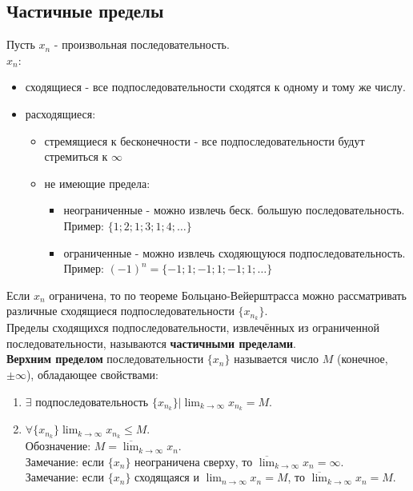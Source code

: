 \documentclass[12pt]{article}
\begin{document}
    \subsection{Частичные пределы}
    \noindent Пусть $x_n$ - произвольная последовательность.\\
    $x_n$:
    \begin{itemize}
        \item сходящиеся - все подпоследовательности сходятся к одному и тому же числу.
        \item расходящиеся:
              \begin{itemize}
                \item стремящиеся к бесконечности - все подпоследовательности будут стремиться к $\infty$
                \item не имеющие предела:
                      \begin{itemize}
                        \item неограниченные - можно извлечь беск. большую последовательность.\\Пример: $\{1; 2; 1; 3; 1; 4; \dots\}$
                        \item ограниченные - можно извлечь сходяющуюся подпоследовательность.\\Пример: $(-1)^n = \{-1; 1; -1; 1; -1; 1; \dots\}$
                      \end{itemize}
              \end{itemize}
    \end{itemize}
    Если $x_n$ ограничена, то по теореме Больцано-Вейерштрасса можно рассматривать различные сходящиеся подпоследовательности $\{x_{n_{k}}\}$.\\
    Пределы сходящихся подпоследовательности, извлечённых из ограниченной последовательности, называются \textbf{частичными пределами}.\\
    \textbf{Верхним пределом} последовательности $\{x_n\}$ называется число $M$ (конечное, $\pm \infty$), обладающее свойствами:
    \begin{enumerate}
        \item $\exists$ подпоследовательность $\{x_{n_{k}}\} \Big| \lim_{k\to\infty}x_{n_{k}} = M$.
        \item $\forall \{x_{n_{k}}\} \lim_{k\to\infty} x_{n_{k}} \le M$.\\
        Обозначение: $M = \overline{\lim}_{k\to\infty}x_n$.\\
        Замечание: если $\{x_n\}$ неограничена сверху, то $\overline{\lim}_{k\to\infty}x_n = \infty$.\\
        Замечание: если $\{x_n\}$ сходящаяся и $\lim_{n\to\infty} x_n = M$, то $\overline{\lim}_{k\to\infty}x_n = M$.
    \end{enumerate}
\end{document}
